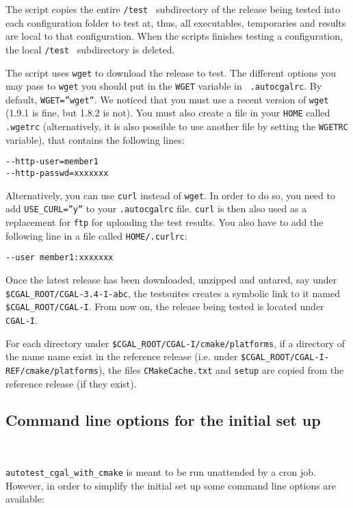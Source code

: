 The script copies the entire {\tt /test } subdirectory of the release being tested
into each configuration folder to test at, thus, all executables, temporaries
and results are local to that configuration. When the scripts finishes testing 
a configuration, the local {\tt /test } subdirectory is deleted.

The script uses {\tt wget} to download the release to test. The different options you
may pass to {\tt wget} you should put in the {\tt WGET} variable in {\tt
.autocgalrc}. By default, {\tt WGET=''wget''}. We noticed that you must use
a recent version of {\tt wget} (1.9.1 is fine, but 1.8.2 is not). You must
also create a file in your {\tt HOME} called {\tt .wgetrc} (alternatively,
it is also possible to use another file by setting the {\tt WGETRC} variable),
that contains the following lines:
\begin{verbatim}
--http-user=member1
--http-passwd=xxxxxxx
\end{verbatim}

Alternatively, you can use {\tt curl} instead of {\tt wget}.  In order to
do so, you need to add {\tt USE\_CURL=''y''} to your {\tt .autocgalrc} file.
{\tt curl} is then also used as a replacement for {\tt ftp} for uploading the
test results.
You also have to add the following line in a file called {\tt HOME/.curlrc}:
\begin{verbatim}
--user member1:xxxxxxx
\end{verbatim}

Once the latest release has been downloaded, unzipped and untared, 
say under {\tt \$CGAL\_ROOT/CGAL-3.4-I-abc}, the testsuites creates
a symbolic link to it named {\tt \$CGAL\_ROOT/CGAL-I}. From now on,
the release being tested is located under {\tt CGAL-I}.

For each directory under {\tt \$CGAL\_ROOT/CGAL-I/cmake/platforms}, 
if a directory of the name name exist in the reference release 
(i.e. under {\tt \$CGAL\_ROOT/CGAL-I-REF/cmake/platforms}),
the files {\tt CMakeCache.txt} and {\tt setup} are copied
from the reference release (if they exist). 

\subsection{Command line options for the initial set up} ~

{\tt autotest\_cgal\_with\_cmake} is meant to be run unattended by a cron job. 
However, in order to simplify the initial set up some command line options are available:

